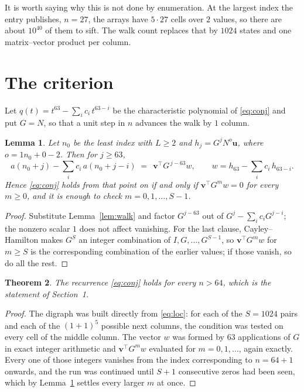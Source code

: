 \documentclass[11pt,a4paper]{article}
\theoremstyle{plain}
\newtheorem{theorem}{Theorem}
\newtheorem{lemma}[theorem]{Lemma}
\theoremstyle{definition}
\begin{document}
It is worth saying why this is not done by enumeration. At the largest index the entry
publishes, $n=27$, the arrays have $5\cdot27$ cells over
$2$ values, so there are about $10^{40}$ of them to sift. The
walk count replaces that by $1024$ states and one matrix--vector product per column.
\section{The criterion}

Let $q(t)=t^{63}-\sum_i c_i\,t^{63-i}$ be the characteristic polynomial of
\eqref{eq:conj} and put $G=N$, so that a unit step in $n$ advances the walk by
$1$ column.

\begin{lemma}\label{lem:crit}
Let $n_0$ be the least index with $L\ge2$ and $h_j=G^{j}N^{o}\mathbf{u}$, where
$o=1n_0+0-2$. Then for $j\ge63$,
\[
a(n_0+j)-\sum_i c_i\,a(n_0+j-i)\;=\;\,\mathbf{v}^{\!\top}G^{\,j-63}w,
\qquad w=h_{63}-\sum_i c_i\,h_{63-i} .
\]
Hence \eqref{eq:conj} holds from that point on if and only if
$\mathbf{v}^{\!\top}G^{m}w=0$ for every $m\ge0$, and it is enough to check
$m=0,1,\dots,S-1$.
\end{lemma}

\begin{proof}
Substitute Lemma~\ref{lem:walk} and factor $G^{j-63}$ out of
$G^{j}-\sum_ic_iG^{j-i}$; the nonzero scalar $1$ does not affect
vanishing. For the last clause, Cayley--Hamilton makes $G^{S}$ an integer combination of
$I,G,\dots,G^{S-1}$, so $\mathbf{v}^{\!\top}G^{m}w$ for $m\ge S$ is the corresponding
combination of the earlier values; if those vanish, so do all the rest.
\end{proof}

\begin{theorem}
The recurrence \eqref{eq:conj} holds for every $n>64$, which is the statement of
Section~1.
\end{theorem}

\begin{proof}
The digraph was built directly from \eqref{eq:loc}: for each of the $S=1024$ pairs and each
of the $(1+1)^{5}$ possible next columns, the condition was tested on every cell of
the middle column. The vector $w$ was formed by $63$ applications of $G$ in exact integer
arithmetic and $\mathbf{v}^{\!\top}G^{m}w$ evaluated for $m=0,1,\dots$, again exactly.
Every one of those integers vanishes from the index corresponding to $n=64+1$ onwards,
and the run was continued until $S+1$ consecutive zeros had been seen, which by
Lemma~\ref{lem:crit} settles every larger $m$ at once.
\end{proof}
\end{document}
